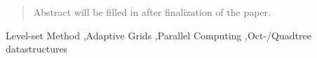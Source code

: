 \begin{abstract}
Abstract will be filled in after finalization of the paper.
\end{abstract}

\begin{keyword}
Level-set Method \sep Adaptive Grids \sep Parallel Computing \sep Oct-/Quadtree datastructures
\end{keyword}

\maketitle
